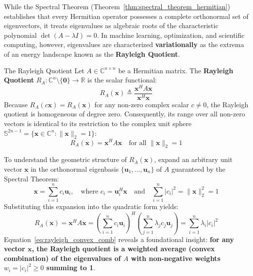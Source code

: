 While the Spectral Theorem (Theorem~\ref{thm:spectral_theorem_hermitian}) establishes that every Hermitian operator possesses a complete orthonormal set of eigenvectors, it treats eigenvalues as algebraic roots of the characteristic polynomial $\det(A - \lambda I) = 0$. In machine learning, optimization, and scientific computing, however, eigenvalues are characterized \textbf{variationally} as the extrema of an energy landscape known as the \textbf{Rayleigh Quotient}.

\begin{definitionbox}{The Rayleigh Quotient}
\label{def:rayleigh_quotient}
Let $A \in \mathbb{C}^{n \times n}$ be a Hermitian matrix. The \textbf{Rayleigh Quotient} $R_A: \mathbb{C}^n \setminus \{\mathbf{0}\} \to \mathbb{R}$ is the scalar functional:
\begin{equation}
R_A(\mathbf{x}) \triangleq \frac{\mathbf{x}^H A \mathbf{x}}{\mathbf{x}^H \mathbf{x}}
\label{eq:rayleigh_quotient_def}
\end{equation}
Because $R_A(c \mathbf{x}) = R_A(\mathbf{x})$ for any non-zero complex scalar $c \ne 0$, the Rayleigh quotient is homogeneous of degree zero. Consequently, its range over all non-zero vectors is identical to its restriction to the complex unit sphere $\mathbb{S}^{2n-1} = \{\mathbf{x} \in \mathbb{C}^n : \|\mathbf{x}\|_2 = 1\}$:
\begin{equation}
R_A(\mathbf{x}) = \mathbf{x}^H A \mathbf{x} \quad \text{for all } \|\mathbf{x}\|_2 = 1
\end{equation}
\end{definitionbox}

To understand the geometric structure of $R_A(\mathbf{x})$, expand an arbitrary unit vector $\mathbf{x}$ in the orthonormal eigenbasis $\{\mathbf{u}_1, \dots, \mathbf{u}_n\}$ of $A$ guaranteed by the Spectral Theorem:
\begin{equation*}
\mathbf{x} = \sum_{i=1}^n c_i \mathbf{u}_i, \quad \text{where } c_i = \mathbf{u}_i^H \mathbf{x} \quad \text{and} \quad \sum_{i=1}^n |c_i|^2 = \|\mathbf{x}\|_2^2 = 1
\end{equation*}
Substituting this expansion into the quadratic form yields:
\begin{equation}
R_A(\mathbf{x}) = \mathbf{x}^H A \mathbf{x} = \left(\sum_{i=1}^n c_i \mathbf{u}_i\right)^H \left(\sum_{j=1}^n \lambda_j c_j \mathbf{u}_j\right) = \sum_{i=1}^n \lambda_i |c_i|^2
\label{eq:rayleigh_convex_comb}
\end{equation}
Equation~\eqref{eq:rayleigh_convex_comb} reveals a foundational insight: \textbf{for any vector $\mathbf{x}$, the Rayleigh quotient is a weighted average (convex combination) of the eigenvalues of $A$ with non-negative weights $w_i = |c_i|^2 \ge 0$ summing to 1}.

